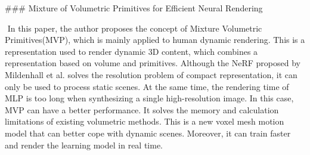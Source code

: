 ### Mixture of Volumetric Primitives for Efficient Neural Rendering

​	In this paper, the author proposes the concept of Mixture Volumetric Primitives(MVP), which is mainly applied to human dynamic rendering. This is a representation used to render dynamic 3D content, which combines a representation based on volume and primitives. Although the NeRF proposed by Mildenhall et al. solves the resolution problem of compact representation, it can only be used to process static scenes. At the same time, the rendering time of MLP is too long when synthesizing a single high-resolution image. In this case, MVP can have a better performance. It solves the memory and calculation limitations of existing volumetric methods. This is a new voxel mesh motion model that can better cope with dynamic scenes. Moreover, it can train faster and render the learning model in real time. 

